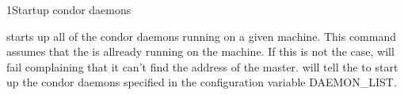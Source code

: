 \begin{ManPage}{}{1}{Startup condor daemons}
\label{man-condor-on}
\Synopsis {}

\Description 

 starts up all of the condor daemons running on a given
machine.  This command assumes that the  is allready
running on the machine.  If this is not the case,  will
fail complaining that it can't find the address of the master.  
will tell the  to start up the condor daemons specified
in the configuration variable DAEMON\_LIST.

\begin{Options}
\end{Options}

\end{ManPage}
